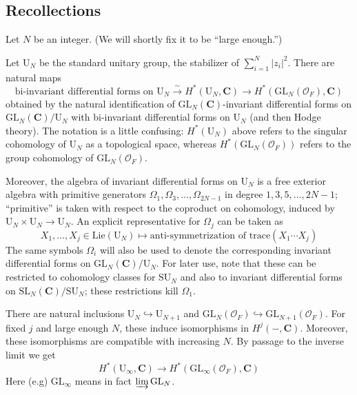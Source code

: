 \documentclass[10pt]{amsart}
\newcommand{\SL}{\mathrm{SL}}
\newcommand{\C}{\mathbf{C}}
\newcommand{\OO}{\mathcal{O}}
\newcommand{\GL}{\mathrm{GL}}
\theoremstyle{remark}
\begin{document}
 
 

\subsection{Recollections} \label{sec:Recollections} 
 
Let $N$ be an integer. (We will shortly fix it to be ``large enough.'')

Let $\mathrm{U}_N$ be the standard unitary group, the stabilizer of $\sum_{i=1}^N |z_i|^2$. 
 There are  natural maps  
 \begin{equation} \label{mapN} \mbox{bi-invariant differential forms on $\mathrm{U}_N$}  \stackrel{\sim}{\rightarrow}  H^*(\mathrm{U}_N, \C)   \longrightarrow H^*(\GL_N(\OO_F), \C) \end{equation}
%
obtained by  the natural identification of  $\GL_N(\C)$-invariant differential forms on $\GL_N(\C)/\mathrm{U}_N$ 
with bi-invariant differential forms on $\mathrm{U}_N$ (and then Hodge theory).     The notation is a little confusing:  $H^*(\mathrm{U}_N)$ above refers to the singular cohomology of $\mathrm{U}_N$ as a topological space,
whereas $H^*(\GL_N(\OO_F))$ refers to the group cohomology of $\GL_N(\OO_F)$. 

Moreover, 
the algebra of invariant differential forms on $\mathrm{U}_N$ is a free exterior algebra with  primitive  generators
$\Omega_1, \Omega_3, \dots, \Omega_{2N-1}$ in degree $1, 3, 5, \dots, 2N-1$;
``primitive'' is taken with respect to the 
coproduct on cohomology, induced by $\mathrm{U}_N\times \mathrm{U}_N \rightarrow \mathrm{U}_N$. 
An  explicit representative for $\Omega_j$ can be taken as
\begin{equation} \label{oinkoink} X_1, \dots, X_j \in \mathrm{Lie}(\mathrm{U}_N) \mapsto \mbox{anti-symmetrization of $\mathrm{trace}(X_1 \cdots X_j) $} \end{equation}
The same symbols $\Omega_i$ will also be used to denote the corresponding invariant differential forms on $\GL_N(\C)/\mathrm{U}_N$. 
For later use, note
that these can be restricted to cohomology classes for $\mathrm{SU}_N$ and also  to invariant differential forms on $\SL_N(\C)/\mathrm{SU}_N$;
these restrictions kill $\Omega_1$.  





There are natural inclusions $\mathrm{U}_N \hookrightarrow \mathrm{U}_{N+1}$
and $\GL_N(\OO_F) \hookrightarrow \GL_{N+1}(\OO_F)$. 
For fixed $j$ and large enough $N$, these induce isomorphisms in $H^j(-, \C)$. Moreover,
these isomorphisms are compatible with increasing $N$.   By passage to the inverse limit we get 
 $$H^*(\mathrm{U}_{\infty}, \C)  {\longrightarrow} H^*(\GL_{\infty}(\OO_F), \C)$$
 Here (e.g) $\GL_{\infty}$  means in fact $\varinjlim \GL_N$. 
 
\end{document}
